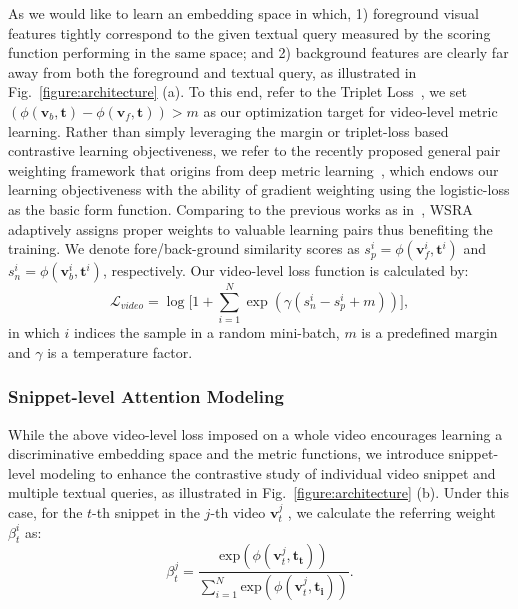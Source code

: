 As we would like to learn an embedding space in which,
1) foreground visual features tightly correspond to the given textual query measured by
the scoring function performing in the same space;
and 2) background features are clearly far away from both the foreground and textual query, as illustrated in Fig.~\ref{figure:architecture} (a).
To this end, refer to the Triplet Loss~\citep{7298682}, we set $(\phi(\boldsymbol{v}_b, \boldsymbol{t})-\phi(\boldsymbol{v}_f, \boldsymbol{t}))>m$ as our optimization target for video-level metric learning.
Rather than simply leveraging the margin or triplet-loss based contrastive learning objectiveness, we refer to the recently proposed general pair weighting framework that origins from deep metric learning~\citep{wang2020vitaa,wang2019multi}, which endows our learning objectiveness with the ability of gradient weighting using the logistic-loss as the basic form function. Comparing to the previous works as in~\citep{Mithun_2019_CVPR, chen2020look}, WSRA adaptively assigns proper weights to valuable learning pairs thus benefiting the training. 
We denote fore/back-ground similarity scores as $s_p^i=\phi(\boldsymbol{v}_f^i, \boldsymbol{t}^i)$ and $s_n^i=\phi(\boldsymbol{v}_b^i, \boldsymbol{t}^i)$, respectively. Our video-level loss function is calculated by:
\begin{equation}
    \mathcal{L}_{video} = \log\Big[1+\sum_{i=1}^{N}\exp(\gamma(s_n^i-s_p^i+m))\Big],
    \label{eq:video}
\end{equation}
in which $i$ indices the sample in a random mini-batch, $m$ is a predefined margin and $\gamma$ is a temperature factor.


\subsubsection{Snippet-level Attention Modeling}
While the above video-level loss imposed on a whole video encourages learning a discriminative embedding space and the metric functions, we introduce snippet-level modeling to enhance the contrastive study of individual video snippet and multiple textual queries, as illustrated in Fig.~\ref{figure:architecture} (b). Under this case, for the $t$-th snippet in the $j$-th video $\boldsymbol{v}_t^j$ , we calculate the referring weight $\beta_t^i$ as:
\begin{equation}
    \beta_t^j = \frac{\text{exp}(\phi(\boldsymbol{v}_t^j, \boldsymbol{t_t}))}{{\sum_{i=1}^{N}\text{exp}(\phi(\boldsymbol{v}_t^j, \boldsymbol{t_i}))}}.
    \label{eq:snippetweight}
\end{equation}



